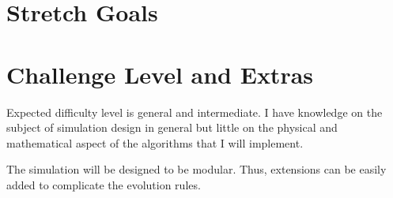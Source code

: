 \documentclass{article}
\begin{document}
\section{Stretch Goals}

\section{Challenge Level and Extras}

Expected difficulty level is general and intermediate. I have knowledge on the subject of simulation design in general but little on the physical and mathematical aspect of the algorithms that I will implement. 

The simulation will be designed to be modular. Thus, extensions can be easily added to complicate the evolution rules.
  
\end{document}
